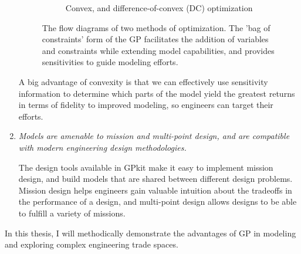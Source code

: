 \begin{enumerate}
\begin{figure*}[!b]
\begin{subfigure}[b]{0.5\linewidth}
\begin{center}
{}
            \end{center}
            \caption{Convex, and difference-of-convex (DC) optimization}
        \end{subfigure}
        \caption{The flow diagrams of two methods of optimization. The 'bag of constraints'
        form of the GP facilitates the addition of variables and constraints while extending
        model capabilities, and provides sensitivities to guide modeling efforts.}
        \label{f:optflow}
    \end{figure*}

    A big advantage of convexity is that we can effectively use sensitivity information
    to determine which parts of the
    model yield the greatest returns in terms of fidelity to improved modeling, so engineers can target
    their efforts.

    \item \textit{Models are amenable to mission and multi-point design, and are compatible with modern
    engineering design methodologies.}

    The design tools available in GPkit make it easy to
    implement mission design, and build models that are shared between
    different design problems. Mission design helps engineers gain valuable intuition about
    the tradeoffs in the performance of a design, and multi-point design allows designs to
    be able to fulfill a variety of missions.

\end{enumerate}

In this thesis, I will methodically demonstrate the advantages of \gls{GP} in modeling
and exploring complex engineering trade spaces.



